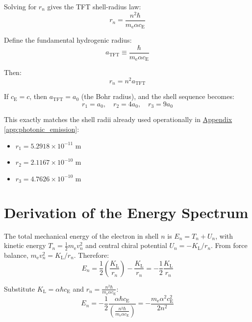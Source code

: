 Solving for $r_n$ gives the TFT shell-radius law:
\begin{equation}
    r_n = \frac{n^2 \hbar}{m_{\mathrm{e}} \alpha c_{\mathrm{E}}}
\end{equation}

Define the fundamental hydrogenic radius:
\begin{equation}
    a_{\mathrm{TFT}} \equiv \frac{\hbar}{m_{\mathrm{e}} \alpha c_{\mathrm{E}}}
\end{equation}

Then:
\begin{equation}
    r_n = n^2 a_{\mathrm{TFT}}
\end{equation}

If $c_{\mathrm{E}} = c$, then $a_{\mathrm{TFT}} = a_0$ (the Bohr radius), and the shell sequence becomes:
\begin{equation}
    r_1 = a_0, \quad r_2 = 4a_0, \quad r_3 = 9a_0
\end{equation}

This exactly matches the shell radii already used operationally in \hyperref[app:photonic_emission]{Appendix \ref*{app:photonic_emission}}:
\begin{itemize}
    \item $r_1 = 5.2918 \times 10^{-11}$ m
    \item $r_2 = 2.1167 \times 10^{-10}$ m
    \item $r_3 = 4.7626 \times 10^{-10}$ m
\end{itemize}

\section{Derivation of the Energy Spectrum}
The total mechanical energy of the electron in shell $n$ is $E_n = T_n + U_n$, with kinetic energy $T_n = \frac{1}{2} m_{\mathrm{e}} v_n^2$ and central chiral potential $U_n = -K_{\mathrm{L}}/r_n$. From force balance, $m_{\mathrm{e}} v_n^2 = K_{\mathrm{L}}/r_n$. Therefore:
\begin{equation}
    E_n = \frac{1}{2} \left(\frac{K_{\mathrm{L}}}{r_n}\right) - \frac{K_{\mathrm{L}}}{r_n} = -\frac{1}{2} \frac{K_{\mathrm{L}}}{r_n}
\end{equation}

Substitute $K_{\mathrm{L}} = \alpha\hbar c_{\mathrm{E}}$ and $r_n = \frac{n^2 \hbar}{m_{\mathrm{e}} \alpha c_{\mathrm{E}}}$:
\begin{equation}
    E_n = -\frac{1}{2} \frac{\alpha\hbar c_{\mathrm{E}}}{\left(\frac{n^2 \hbar}{m_{\mathrm{e}} \alpha c_{\mathrm{E}}}\right)} = -\frac{m_{\mathrm{e}} \alpha^2 c_{\mathrm{E}}^2}{2n^2}
\end{equation}

